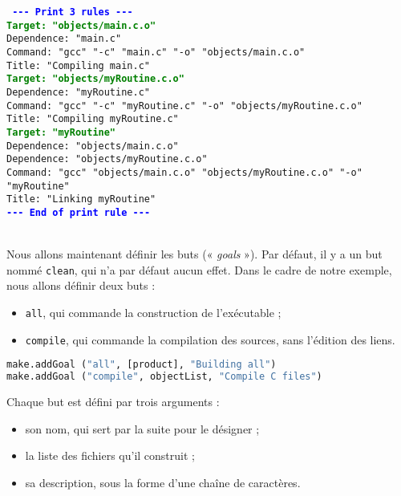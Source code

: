 \documentclass[a4paper,12pt,obeyspaces,openany]{extarticle}
\begin{document}
\noindent\texttt{\footnotesize
\textcolor{blue}{\bf{-}{-}{-} Print 3 rules {-}{-}{-}}\\
\textcolor{green}{\bf Target: "objects/main.c.o"}\\
\hspace*{1.2em}Dependence: "main.c"\\
\hspace*{1.2em}Command:  "gcc" "-c" "main.c" "-o" "objects/main.c.o"\\
\hspace*{1.2em}Title: "Compiling main.c"\\
\textcolor{green}{\bf Target: "objects/myRoutine.c.o"}\\
\hspace*{1.2em}Dependence: "myRoutine.c"\\
\hspace*{1.2em}Command:  "gcc" "-c" "myRoutine.c" "-o" "objects/myRoutine.c.o"\\
\hspace*{1.2em}Title: "Compiling myRoutine.c"\\
\textcolor{green}{\bf Target: "myRoutine"}\\
\hspace*{1.2em}Dependence: "objects/main.c.o"\\
\hspace*{1.2em}Dependence: "objects/myRoutine.c.o"\\
\hspace*{1.2em}Command:  "gcc" "objects/main.c.o" "objects/myRoutine.c.o" "-o" "myRoutine"\\
\hspace*{1.2em}Title: "Linking myRoutine"\\
\textcolor{blue}{\bf{-}{-}{-} End of print rule {-}{-}{-}}
}

~\\Nous allons maintenant définir les buts (« \emph{goals} »). Par défaut, il y a un but nommé \texttt{clean}, qui n'a par défaut aucun effet. Dans le cadre de notre exemple, nous allons définir deux buts :
\begin{itemize}
  \item \texttt{all}, qui commande la construction de l'exécutable ;
  \item \texttt{compile}, qui commande la compilation des sources, sans l'édition des liens.
\end{itemize}

\begin{lstlisting}[language=py]
make.addGoal ("all", [product], "Building all")
make.addGoal ("compile", objectList, "Compile C files")
\end{lstlisting}
Chaque but est défini par trois arguments :
\begin{itemize}
\item son nom, qui sert par la suite pour le désigner ;
\item la liste des fichiers qu'il construit ;
\item sa description, sous la forme d'une chaîne de caractères.
\end{itemize}
\end{document}
